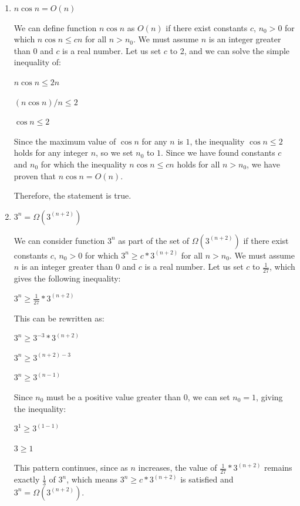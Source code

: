 \documentclass[11pt]{article}
\begin{document}
\begin{enumerate}
Thus, the value for $n$ at which the left side of the equation surpasses the right is roughly $n = 72.4$. 
The same pattern applies to any possible value for $c$, as $e^n$ grows at a different order of magnitude as $2^n$. 
Therefore, $e^n = O(2^{n})$ is false.

This means that $e^n = \Theta(2^{n})$ is false.

\item $n \cos n = O(n)$

We can define function $n \cos n$ as $O(n)$ if there exist constants $c$, $n_0 > 0$ for which $n \cos n \leq cn$ for all $n > n_0$. 
We must assume $n$ is an integer greater than 0 and $c$ is a real number. 
Let us set $c$ to 2, and we can solve the simple inequality of:

$n \cos n \leq 2n$

$(n \cos n) / n \leq 2$

$\cos n \leq 2$

Since the maximum value of $\cos n$ for any $n$ is $1$, the inequality $\cos n \leq 2$ holds for any integer $n$, so we set $n_0$ to $1$. 
Since we have found constants $c$ and $n_0$ for which the inequality $n \cos n \leq cn$ holds for all $n > n_0$, we have proven that $n \cos n = O(n)$.

Therefore, the statement is true.

\item $3^n = \Omega(3^{(n+2)})$

We can consider function $3^n$ as part of the set of $\Omega(3^{(n+2)})$ if there exist constants $c$, $n_0 > 0$ for which $3^n \geq c * 3^{(n+2)}$ for all $n > n_0$. 
We must assume $n$ is an integer greater than 0 and $c$ is a real number. 
Let us set $c$ to $\frac{1}{27}$, which gives the following inequality:

$3^n \geq \frac{1}{27} * 3^{(n+2)}$

This can be rewritten as:

$3^n \geq 3^{-3} * 3^{(n+2)}$

$3^n \geq 3^{(n+2)-3}$

$3^n \geq 3^{(n-1)}$

Since $n_0$ must be a positive value greater than $0$, we can set $n_0 = 1$, giving the inequality:

$3^1 \geq 3^{(1-1)}$

$3 \geq 1$

This pattern continues, since as $n$ increases, the value of $\frac{1}{27} * 3^{(n+2)}$ remains exactly $\frac{1}{3}$ of $3^n$, 
which means $3^n \geq c * 3^{(n+2)}$ is satisfied and $3^n = \Omega(3^{(n+2)})$.


\end{enumerate}
\end{document}
